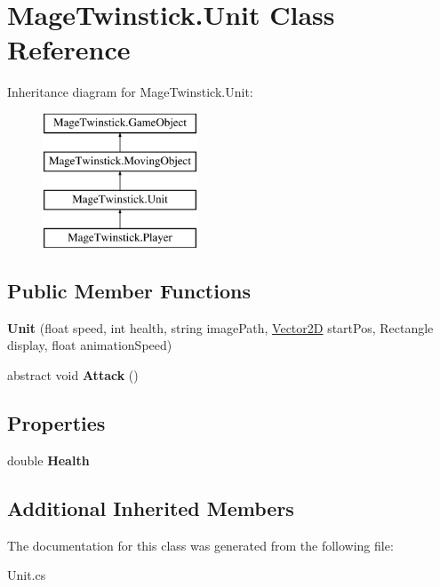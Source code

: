 \hypertarget{class_mage_twinstick_1_1_unit}{}\section{Mage\+Twinstick.\+Unit Class Reference}
\label{class_mage_twinstick_1_1_unit}
Inheritance diagram for Mage\+Twinstick.\+Unit\+:\begin{figure}[H]
\begin{center}
\leavevmode
\includegraphics[height=4.000000cm]{class_mage_twinstick_1_1_unit}
\end{center}
\end{figure}
\subsection*{Public Member Functions}
\begin{DoxyCompactItemize}
\item 
\hypertarget{class_mage_twinstick_1_1_unit_a857d0f6e0f55b4c81e2a3bbf8711dd18}{}{\bfseries Unit} (float speed, int health, string image\+Path, \hyperlink{class_mage_twinstick_1_1_vector2_d}{Vector2\+D} start\+Pos, Rectangle display, float animation\+Speed)\label{class_mage_twinstick_1_1_unit_a857d0f6e0f55b4c81e2a3bbf8711dd18}

\item 
\hypertarget{class_mage_twinstick_1_1_unit_a98b69920e6c6c09c5cfaacbf42a31bbf}{}abstract void {\bfseries Attack} ()\label{class_mage_twinstick_1_1_unit_a98b69920e6c6c09c5cfaacbf42a31bbf}

\end{DoxyCompactItemize}
\subsection*{Properties}
\begin{DoxyCompactItemize}
\item 
\hypertarget{class_mage_twinstick_1_1_unit_a5c06094e798c41a5d484f6ee00757667}{}double {\bfseries Health}\label{class_mage_twinstick_1_1_unit_a5c06094e798c41a5d484f6ee00757667}

\end{DoxyCompactItemize}
\subsection*{Additional Inherited Members}


The documentation for this class was generated from the following file\+:\begin{DoxyCompactItemize}
\item 
Unit.\+cs\end{DoxyCompactItemize}
